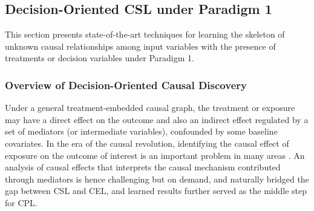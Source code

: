 



\subsection{Decision-Oriented \acrshort{CSL} under Paradigm 1 }\label{sec:CSL_P1}

This section presents state-of-the-art techniques for learning the skeleton of unknown causal relationships among input variables with the presence of treatments or decision variables under Paradigm 1. 

\subsubsection{Overview of Decision-Oriented Causal Discovery}
Under a general treatment-embedded causal graph, the treatment or exposure may have a direct effect on the outcome and also an indirect effect regulated by a set of mediators (or intermediate variables), confounded by some baseline covariates. 
In the era of the causal revolution, identifying the causal effect of exposure on the outcome of interest is an important problem in many areas \citep[see e.g., ][]{chakrabortty2018inference,cai2020anoce,watson2023heterogeneous}. 
An analysis of causal effects that interprets the causal mechanism contributed through mediators is hence challenging but on demand, and naturally bridged the gap between \acrshort{CSL} and \acrshort{CEL}, and learned results further served as the middle step for \acrshort{CPL}. 

